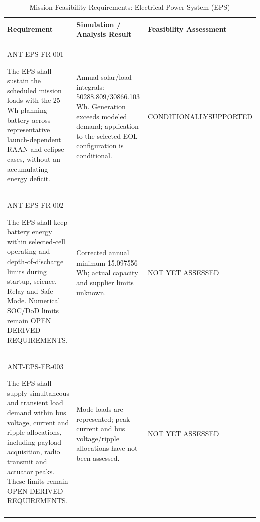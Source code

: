 \begin{table}[H]\centering\small\setlength{\tabcolsep}{3pt}
\caption{Mission Feasibility Requirements: Electrical Power System (EPS)}\label{tab:fr-eps}
\begin{tabular}{@{}
>{\RaggedRight\arraybackslash}p{}
>{\RaggedRight\arraybackslash}p{}
>{\RaggedRight\arraybackslash}p{}
@{}}
\toprule Requirement & Simulation / Analysis Result & Feasibility Assessment\\\midrule
{}\label{req:ANT-EPS-FR-001}\mbox{ANT-EPS-}\newline\mbox{FR-001}\par The EPS shall sustain the scheduled mission loads with the 25 Wh planning battery across representative launch-dependent RAAN and eclipse cases, without an accumulating energy deficit. & Annual solar/load integrals: 50288.809/30866.103 Wh. Generation exceeds modeled demand; application to the selected EOL configuration is conditional. & CONDITIONALLY\newline SUPPORTED\\
\addlinespace[3pt]
\label{req:ANT-EPS-FR-002}\mbox{ANT-EPS-}\newline\mbox{FR-002}\par The EPS shall keep battery energy within selected-cell operating and depth-of-discharge limits during startup, science, Relay and Safe Mode. Numerical SOC/DoD limits remain OPEN DERIVED REQUIREMENTS. & Corrected annual minimum 15.097556 Wh; actual capacity and supplier limits unknown. & NOT YET ASSESSED\\
\addlinespace[3pt]
\label{req:ANT-EPS-FR-003}\mbox{ANT-EPS-}\newline\mbox{FR-003}\par The EPS shall supply simultaneous and transient load demand within bus voltage, current and ripple allocations, including payload acquisition, radio transmit and actuator peaks. These limits remain OPEN DERIVED REQUIREMENTS. & Mode loads are represented; peak current and bus voltage/ripple allocations have not been assessed. & NOT YET ASSESSED\\
\addlinespace[3pt]
\bottomrule
\end{tabular}
\end{table}
